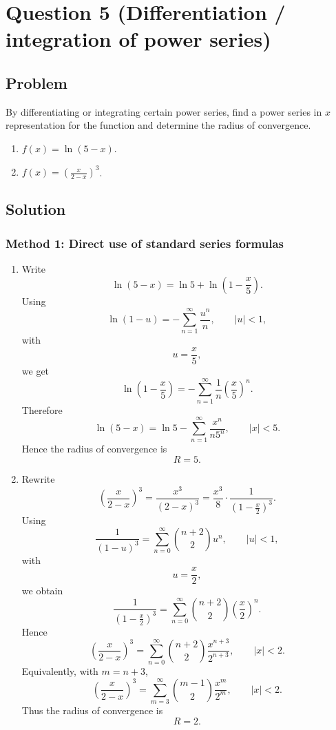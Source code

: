 \documentclass[12pt]{article}
\newcommand{\ds}{\displaystyle}
\begin{document}
\newpage
\section*{Question 5 (Differentiation / integration of power series)}
\subsection*{Problem}
By differentiating or integrating certain power series, find a power series in \(x\) representation for the function and determine the radius of convergence.
\begin{enumerate}[label=(\alph*)]
  \item \(f(x)=\ln(5-x)\).
  \item \(f(x)=\left(\ds \frac{x}{2-x}\right)^3\).
\end{enumerate}


\bigskip
\subsection*{Solution}

\subsubsection*{Method 1: Direct use of standard series formulas}
\begin{enumerate}[label=(\alph*)]
\item Write
\[
\ln(5-x)
=
\ln5+\ln\left(1-\frac x5\right).
\]
Using
\[
\ln(1-u)
=
-\sum_{n=1}^{\infty}\frac{u^n}{n},
\qquad |u|<1,
\]
with
\[
u=\frac x5,
\]
we get
\[
\ln\left(1-\frac x5\right)
=
-\sum_{n=1}^{\infty}\frac1n\left(\frac x5\right)^n.
\]
Therefore
\[
\boxed{
\ln(5-x)
=
\ln5-\sum_{n=1}^{\infty}\frac{x^n}{n5^n},
\qquad |x|<5.
}
\]
Hence the radius of convergence is
\[
\boxed{R=5}.
\]

\newpage
\item Rewrite
\[
\left(\frac{x}{2-x}\right)^3
=
\frac{x^3}{(2-x)^3}
=
\frac{x^3}{8}\cdot\frac1{\left(1-\frac x2\right)^3}.
\]
Using
\[
\frac1{(1-u)^3}
=
\sum_{n=0}^{\infty}\binom{n+2}{2}u^n,
\qquad |u|<1,
\]
with
\[
u=\frac x2,
\]
we obtain
\[
\frac1{\left(1-\frac x2\right)^3}
=
\sum_{n=0}^{\infty}\binom{n+2}{2}\left(\frac x2\right)^n.
\]
Hence
\[
\left(\frac{x}{2-x}\right)^3
=
\sum_{n=0}^{\infty}\binom{n+2}{2}\frac{x^{n+3}}{2^{n+3}},
\qquad |x|<2.
\]
Equivalently, with \(m=n+3\),
\[
\boxed{
\left(\frac{x}{2-x}\right)^3
=
\sum_{m=3}^{\infty}\binom{m-1}{2}\frac{x^m}{2^m},
\qquad |x|<2.
}
\]
Thus the radius of convergence is
\[
\boxed{R=2}.
\]
\end{enumerate}
\end{document}
